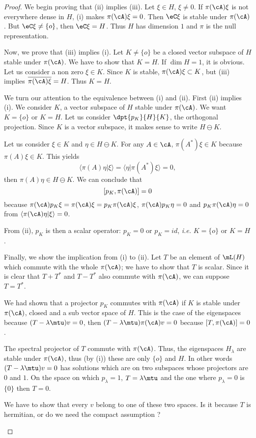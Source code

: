 \begin{proof}
We begin proving that (ii) implies (iii). Let $\xi\in H$, $\xi\neq 0$. 
If $\pi(\cA)\xi$ is not everywhere dense in $H$, (i) makes
$\pi(\cA)\xi=0$. Then $\eC\xi$ is stable under $\pi(\cA)$. But 
$\eC\xi\neq\{o\}$, then $\eC\xi=H$. Thus $H$ has dimension $1$ and $\pi$ 
is the null representation.

Now, we prove that (iii) implies (i). Let $K\neq\{o\}$ be a closed 
vector  
subspace of $H$ stable under $\pi(\cA)$. We have to show that $K=H$. If 
$\dim H=1$, it is obvious. Let us consider a non zero  $\xi\in K$. Since 
$K$ is stable, $\pi(\cA)\xi\subset K$, but (iii) implies
 $\overline{ \pi(\cA)\xi }=H$. Thus $K=H$.

We turn our attention to the equivalence between (i) and (ii). First 
(ii) implies (i). We consider $K$, a vector subspace of $H$ stable under 
$\pi(\cA)$. We want $K=\{o\}$ or $K=H$. Let us consider 
$\dpt{p_K}{H}{K}$, the orthogonal projection. Since $K$ is a vector 
subspace, it makes sense to write $H\ominus K$.

Let us consider $\xi\in K$ and $\eta\in H\ominus K$. For any $A\in\cA$, 
$\pi(A^*)\xi\in K$ because $\pi(A)\xi\in K$. This yields
\[
   \langle \pi(A)\eta|\xi\rangle =\langle\eta|\pi(A^*)\xi\rangle=0,
\]
then $\pi(A)\eta\in H\ominus K$. We can conclude that 
\[
   [p_K,\pi(\cA)]=0
\]
because $\pi(\cA)p_K\xi=\pi(\cA)\xi=p_K\pi(\cA)\xi$, $\pi(\cA)p_K\eta=0$  and $p_K\pi(\cA)\eta=0$ from $\langle \pi(\cA)\eta|\xi\rangle =0$.

From (ii), $p_K$ is then a scalar operator: $p_K=0$ or $p_K=id$, \emph{i.e.} $K=\{o\}$ or $K=H$.

Finally, we show the implication from (i) to (ii). Let $T$ be an element of $\mL(H)$ which commute with the whole $\pi(\cA)$; we have to show that $T$ is scalar. Since it is clear that $T+T^*$ and $T-T^*$ also commute with $\pi(\cA)$, we can suppose $T=T^*$.

We had shown that a projector $p_K$ commutes with $\pi(\cA)$ if $K$ is stable under $\pi(\cA)$, closed and a sub vector space of $H$. This is the case of the eigenspaces because $(T-\lambda\mtu)v=0$, then $(T-\lambda\mtu)\pi(\cA)v=0$ because $[T,\pi(\cA)]=0$.

The spectral projector of $T$ commute with $\pi(\cA)$. Thus, the eigenspaces $H_{\lambda}$ are stable under $\pi(\cA)$, thus (by (i)) these are only $\{o\}$ and $H$. In other words $(T-\lambda\mtu)v=0$ has solutions which are on two subspaces whose projectors are $0$ and $1$. On the space on which $p_{\lambda}=1$, $T=\lambda\mtu$ and the one where $p_{\lambda}=0$ is $\{0\}$ then $T=0$.

\begin{probleme}
    We have to show that every $v$ belong to one of these two spaces. Is it because $T$ is hermitian, or do we need the compact assumption ?
\end{probleme}

\end{proof}

